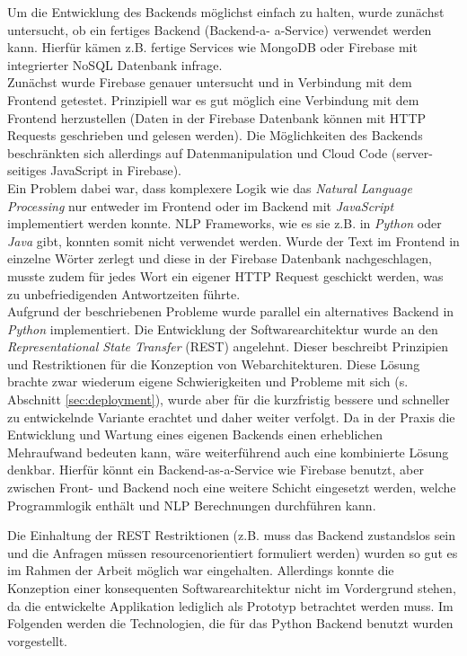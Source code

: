 Um die Entwicklung des Backends möglichst einfach zu halten, wurde zunächst untersucht, ob ein fertiges Backend (Backend-a- a-Service) verwendet werden kann. Hierfür kämen z.B. fertige Services wie MongoDB oder Firebase mit integrierter NoSQL Datenbank infrage\cite{almootassem2017}.\\
Zunächst wurde Firebase genauer untersucht und in Verbindung mit dem Frontend getestet. Prinzipiell war es gut möglich eine Verbindung mit dem Frontend herzustellen (Daten in der Firebase Datenbank können mit HTTP Requests geschrieben und gelesen werden). Die Möglichkeiten des Backends beschränkten sich allerdings auf Datenmanipulation und Cloud Code (server-seitiges JavaScript in Firebase).\\
Ein Problem dabei war, dass komplexere Logik wie das \textit{Natural Language Processing} nur entweder im Frontend oder im Backend mit \textit{JavaScript} implementiert werden konnte. NLP Frameworks, wie es sie z.B. in \textit{Python} oder \textit{Java} gibt, konnten somit nicht verwendet werden. Wurde der Text im Frontend in einzelne Wörter zerlegt und diese in der Firebase Datenbank nachgeschlagen, musste zudem für jedes Wort ein eigener HTTP Request geschickt werden, was zu unbefriedigenden Antwortzeiten führte.\\

Aufgrund der beschriebenen Probleme wurde parallel ein alternatives Backend in \textit{Python} implementiert. Die Entwicklung der Softwarearchitektur wurde an den \textit{Representational State Transfer} (REST) angelehnt. Dieser beschreibt Prinzipien und Restriktionen für die Konzeption von Webarchitekturen\cite{Fielding:2000:ASD:932295}. Diese Lösung brachte zwar wiederum eigene Schwierigkeiten und Probleme mit sich (s. Abschnitt \ref{sec:deployment}), wurde aber für die kurzfristig bessere und schneller zu entwickelnde Variante erachtet und daher weiter verfolgt. Da in der Praxis die Entwicklung und Wartung eines eigenen Backends einen erheblichen Mehraufwand bedeuten kann, wäre weiterführend auch eine kombinierte Lösung denkbar. Hierfür könnt ein Backend-as-a-Service wie Firebase benutzt, aber zwischen Front- und Backend noch eine weitere Schicht eingesetzt werden, welche Programmlogik enthält und NLP Berechnungen durchführen kann.

Die Einhaltung der REST Restriktionen (z.B. muss das Backend zustandslos sein und die Anfragen müssen resourcenorientiert formuliert werden) wurden so gut es im Rahmen der Arbeit möglich war eingehalten. Allerdings konnte die Konzeption einer konsequenten Softwarearchitektur nicht im Vordergrund stehen, da die entwickelte Applikation lediglich als Prototyp betrachtet werden muss. Im Folgenden werden die Technologien, die für das Python Backend benutzt wurden vorgestellt.

